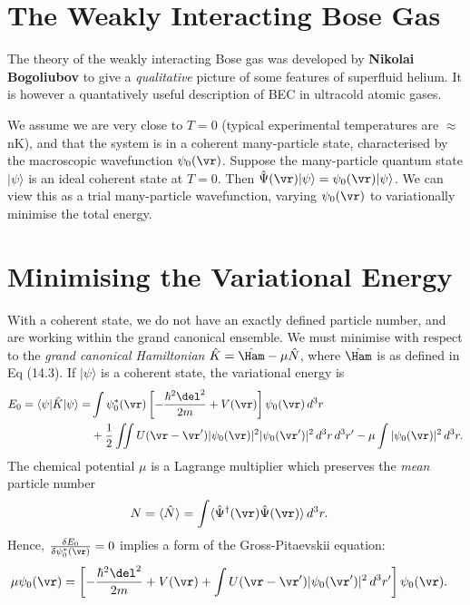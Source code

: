 \documentclass[a4paper, 11pt, normalem]{report}
\begin{document}
\section{The Weakly Interacting Bose Gas}
The theory of the weakly interacting Bose gas was developed by \textbf{Nikolai Bogoliubov} to give a \emph{qualitative} picture of some features of superfluid helium.
It is however a quantatively useful description of BEC in ultracold atomic gases.

We assume we are very close to $T=0$ (typical experimental temperatures are $\approx$ nK), and that the system is in a coherent many-particle state, characterised by the macroscopic wavefunction $\psi_0(\vr)$.
Suppose the many-particle quantum state $|\psi\rangle$ is an ideal coherent state at $T=0$.
Then $\hat{\Psi}(\vr)|\psi\rangle = \psi_0(\vr)|\psi\rangle$.
We can view this as a trial many-particle wavefunction, varying $\psi_0(\vr)$ to variationally minimise the total energy.

\section{Minimising the Variational Energy}
With a coherent state, we do not have an exactly defined particle number, and are working within the grand canonical ensemble.
We must minimise with respect to the \emph{grand canonical Hamiltonian} $\hat{K}=\hat{\Ham}-\mu\hat{N}$, where $\hat{\Ham}$ is as defined in Eq (14.3).
If $|\psi\rangle$ is a coherent state, the variational energy is
\begin{align}
    \begin{split}
        E_0 = \langle\psi|\hat{K}|\psi\rangle = &\int \psi_0^*(\vr)\left[-\frac{\hbar^2\del^2}{2m}+V(\vr)\right]\psi_0(\vr)\,d^3r \\
                                                &+\frac12 \iint U(\vr-\vr')|\psi_0(\vr)|^2|\psi_0(\vr')|^2\,d^3r\,d^3r' - \mu\int |\psi_0(\vr)|^2\,d^3r.
    \end{split}
\end{align}
The chemical potential $\mu$ is a Lagrange multiplier which preserves the \emph{mean} particle number
\begin{align}
    N &= \langle\hat{N}\rangle = \int \langle\hat{\Psi}^\dagger(\vr)\hat{\Psi}(\vr)\rangle\,d^3r.
\end{align}
Hence, $\frac{\delta E_0}{\delta\psi_0^*(\vr)}=0$ implies a form of the Gross-Pitaevskii equation:
\begin{align}
    \mu\psi_0(\vr) &= \left[-\frac{\hbar^2\del^2}{2m}+V(\vr)+\int U(\vr-\vr')|\psi_0(\vr')|^2\,d^3r'\right]\psi_0(\vr).
\end{align}
\end{document}

